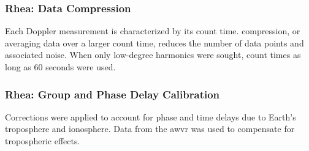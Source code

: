 \documentclass{article}
\begin{document}
            \subsubsection{\footnotesize Rhea: Data Compression}
                Each Doppler measurement is characterized by its count
                time. \Gls{compression}, or averaging data over a larger
                count time, reduces the number of data points and
                associated noise. When only low-degree harmonics were
                sought, count times as long as $60$ seconds were used.
            \subsubsection{\footnotesize Rhea: Group and Phase Delay Calibration}
                Corrections were applied to account for phase and time
                delays due to Earth's \gls{troposphere} and
                \gls{ionosphere}. Data from the \gls{awvr} was used to
                compensate for tropospheric effects.
\end{document}
